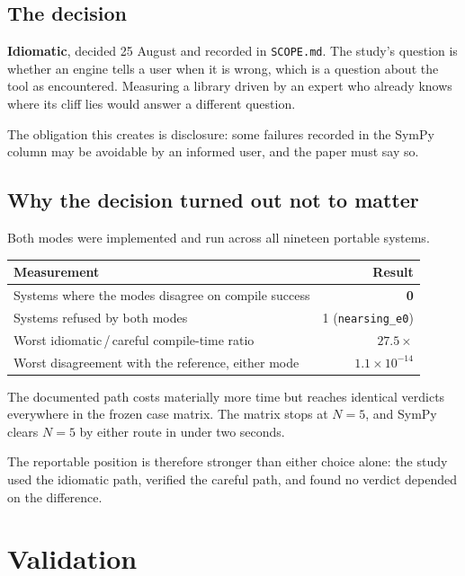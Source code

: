\documentclass[11pt,a4paper]{article}
\begin{document}
\subsection{The decision}

\textbf{Idiomatic}, decided 25 August and recorded in \texttt{SCOPE.md}. The
study's question is whether an engine tells a user when it is wrong, which is a
question about the tool as encountered. Measuring a library driven by an expert
who already knows where its cliff lies would answer a different question.

The obligation this creates is disclosure: some failures recorded in the SymPy
column may be avoidable by an informed user, and the paper must say so.

\subsection{Why the decision turned out not to matter}

Both modes were implemented and run across all nineteen portable systems.

\begin{center}
\begin{tabular}{@{}lr@{}}
\toprule
\textbf{Measurement} & \textbf{Result} \\
\midrule
Systems where the modes disagree on compile success & \textbf{0} \\
Systems refused by both modes & 1 (\texttt{nearsing\_e0}) \\
Worst idiomatic\,/\,careful compile-time ratio & $27.5\times$ \\
Worst disagreement with the reference, either mode & $1.1\times10^{-14}$ \\
\bottomrule
\end{tabular}
\end{center}

\noindent The documented path costs materially more time but reaches identical
verdicts everywhere in the frozen case matrix. The matrix stops at $N=5$, and
SymPy clears $N=5$ by either route in under two seconds.

The reportable position is therefore stronger than either choice alone: the
study used the idiomatic path, verified the careful path, and found no verdict
depended on the difference.

\section{Validation}
\end{document}
